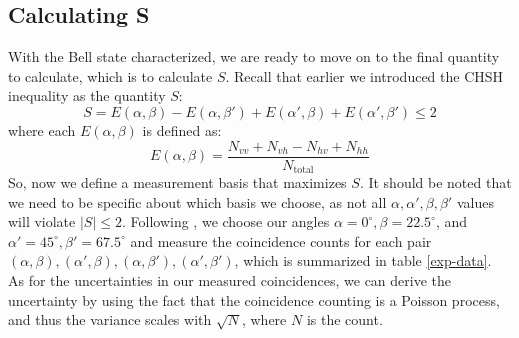 \documentclass[10pt]{article}
\begin{document}
	\subsection{Calculating S}
	With the Bell state characterized, we are ready to move on to the final quantity to calculate, which is
	to calculate \( S \). Recall that earlier we introduced the CHSH inequality as the quantity \( S \):
	\[
		S = E(\alpha, \beta) - E(\alpha, \beta') + E(\alpha', \beta) + E(\alpha', \beta') \leq 2
	\]
	where each \( E(\alpha, \beta) \) is defined as:
	\[
		E(\alpha, \beta) = \frac{N_{vv} + N_{vh} - N_{hv} + N_{hh}}{N_\text{total}}
	\]
	So, now we define a measurement basis that maximizes \( S \). It should be noted that we need to be
	specific about which basis we choose, as not all \( \alpha, \alpha', \beta, \beta' \) values will violate
	\( |S| \leq 2 \). Following \cite{dehlinger}, we choose our angles \( \alpha = 0^{\circ}, \beta = 22.5^{\circ} \),
	and \( \alpha' = 45^{\circ}, \beta' = 67.5^{\circ} \) and measure the coincidence counts for each pair \(
	(\alpha, \beta), (\alpha', \beta), (\alpha, \beta'), (\alpha', \beta')\), which is summarized in table
	\ref{exp-data}. As for the uncertainties in our measured coincidences, we can derive the uncertainty by using the
	fact that the coincidence counting is a Poisson process, and thus the variance scales with \( \sqrt{N}
	\), where \( N \) is the count.   
\end{document}
